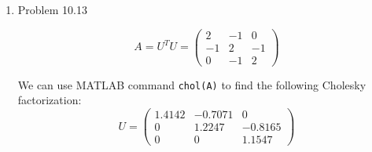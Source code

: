 \documentclass[12pt]{amsart}
\begin{document}
\begin{enumerate}
\begin{enumerate}
\item Solving $A x = b$ can be solved using $LUx = b \iff Ly = b$ and $Ux = y$. So we solve:
\[
\left(\begin{array}{ccc}
1 & & \\
0.6667 & 1 & \\
-0.3333 & -0.3636 & 1 \\
\end{array} \right) y = \left( \begin{array}{c}
-10 \\ 50 \\ -26
\end{array} \right) \]
Using forward-subsitution, we find $y_1 = -10$, then
$-6.667 + y_2 = 50 \Rightarrow y_2 = 56.667$, then
$3.333 -20.6041 + y_3 = -26 \Rightarrow y_3 = -8.7289$.

Then, we use back-substitution to solve the following system:
\[
\right) \left(\begin{array}{ccc}
3 & - 2 & 1 \\
& 7.3333 & -4.6667 \\
& & 3.6364 \\
\end{array}
\right)x  =
\left( \begin{array}{c}
-10 \\ 56.667 \\ -8.7289
\end{array} \right)
\]
First, we have $x_3 = -2.4004$, then $7.3333 x_2 - 4.6667
\times(-2.4004) = 56.667 \Rightarrow x_2 = 6.200$, and then
$3\times x_1 + (-2)\times (6.2000) + 1 \times (-2.4004) = 
-10 \Rightarrow x_1 = 1.600$. \\

The solution therefore is $(1.600, 6.200,-2.400)$.

\end{enumerate}

\vfill
\pagebreak

\item Problem 10.13

\[A = U^T U = \left( \begin{array}{ccc}
2 & -1 & 0 \\ -1 & 2 & -1 \\ 0 & -1 & 2 
\end{array} \right)\]

We can use MATLAB command {\tt chol(A)} to find
the following Cholesky factorization:
\[U = \left( \begin{array}{ccc}
1.4142 & -0.7071 & 0 \\ 0 & 1.2247 & -0.8165 \\ 0 & 0 & 1.1547
\end{array} \right)\]


\end{enumerate}
\end{document}
